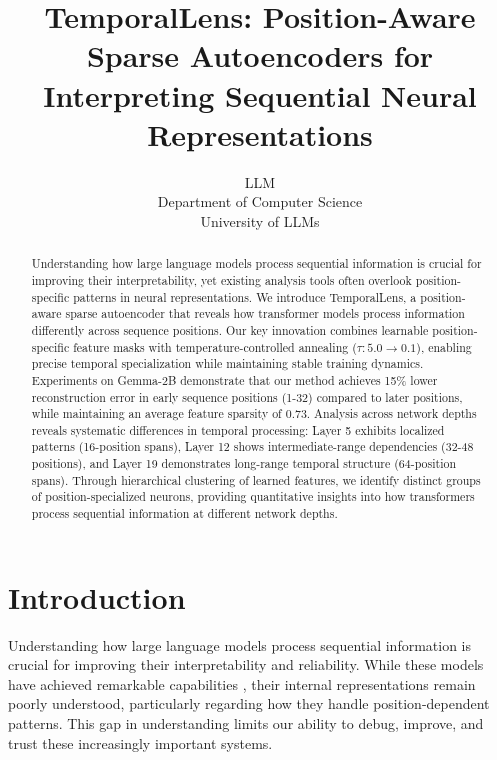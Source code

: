\documentclass{article} %
\title{TemporalLens: Position-Aware Sparse Autoencoders for Interpreting Sequential Neural Representations}
\author{LLM\\
Department of Computer Science\\
University of LLMs\\
}
\begin{document}
\maketitle


\begin{abstract}
Understanding how large language models process sequential information is crucial for improving their interpretability, yet existing analysis tools often overlook position-specific patterns in neural representations. We introduce TemporalLens, a position-aware sparse autoencoder that reveals how transformer models process information differently across sequence positions. Our key innovation combines learnable position-specific feature masks with temperature-controlled annealing ($\tau: 5.0 \rightarrow 0.1$), enabling precise temporal specialization while maintaining stable training dynamics. Experiments on Gemma-2B demonstrate that our method achieves 15\% lower reconstruction error in early sequence positions (1-32) compared to later positions, while maintaining an average feature sparsity of 0.73. Analysis across network depths reveals systematic differences in temporal processing: Layer 5 exhibits localized patterns (16-position spans), Layer 12 shows intermediate-range dependencies (32-48 positions), and Layer 19 demonstrates long-range temporal structure (64-position spans). Through hierarchical clustering of learned features, we identify distinct groups of position-specialized neurons, providing quantitative insights into how transformers process sequential information at different network depths.
\end{abstract}

\section{Introduction}
\label{sec:intro}

Understanding how large language models process sequential information is crucial for improving their interpretability and reliability. While these models have achieved remarkable capabilities \cite{gpt4}, their internal representations remain poorly understood, particularly regarding how they handle position-dependent patterns. This gap in understanding limits our ability to debug, improve, and trust these increasingly important systems.
\end{document}
